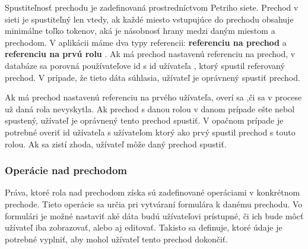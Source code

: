 	Spustiteľnosť prechodu je zadefinovaná prostredníctvom Petriho siete. Prechod v sieti je spustiteľný len vtedy, ak každé  miesto vstupujúce do prechodu obsahuje minimálne toľko tokenov, aká je násobnosť hrany medzi daným miestom a prechodom.
	V aplikácii máme dva typy referencii: \textbf{referenciu na prechod} a \textbf{referenciu na prvú rolu} .
	Ak má prechod nastavenú referenciu na prechod, v databáze sa porovná používateľove id s id užívateľa , ktorý spustil referovaný prechod. V prípade, že tieto dáta súhlasia, užívateľ je oprávnený spustiť prechod.

	Ak má prechod nastavenú referenciu na prvého užívateľa, overí sa ,či sa v procese už daná rola nevyskytla. Ak prechod s danou rolou v danom prípade ešte nebol spustený, užívateľ je oprávnený tento prechod spustiť. V opačnom prípade je potrebné overiť id užívateľa s užívateľom ktorý ako prvý spustil prechod s touto rolou. Ak sa zistí zhoda, užívateľ môže daný prechod spustiť.
	
	
			
	\subsubsection{Operácie nad prechodom}	
	Práva, ktoré rola nad prechodom získa sú zadefinované operáciami v konkrétnom prechode. Tieto operácie sa určia pri vytváraní formulára k danému prechodu.  
	Vo formulári je možné nastaviť aké dáta budú užívateľovi prístupné, či ich bude môcť užívateľ iba zobrazovať, alebo aj editovať. Takisto sa definuje, ktoré údaje je potrebné vyplniť, aby mohol užívateľ tento prechod dokončiť.
	
	
